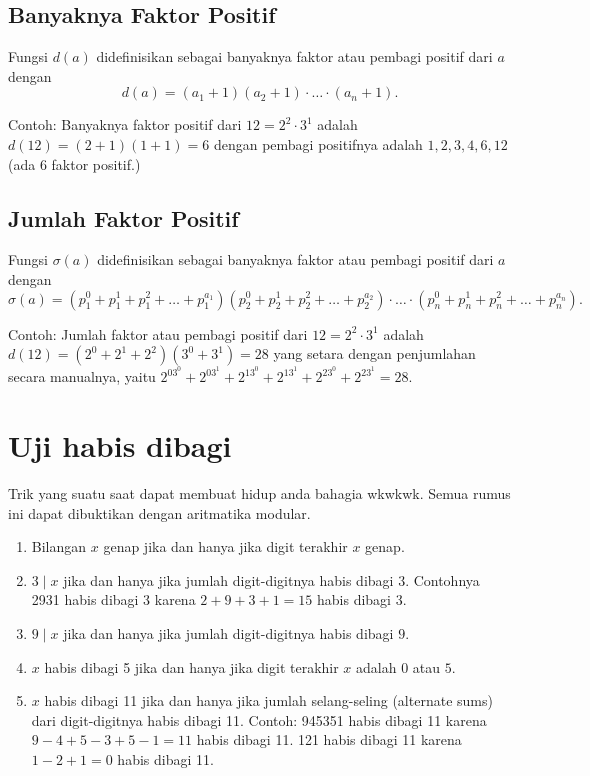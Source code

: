 \documentclass[11pt]{scrartcl}
\begin{document}
	     \subsection{Banyaknya Faktor Positif}
	     Fungsi $d(a)$ didefinisikan sebagai banyaknya faktor atau pembagi positif dari $a$ dengan
	     $$d(a) = (a_1+1)(a_2+1)\cdot \ldots \cdot (a_n+1).$$
	     
	     Contoh: Banyaknya faktor positif dari $12= 2^2 \cdot 3^1$ adalah $d(12)=(2+1)(1+1)=6$ dengan pembagi positifnya adalah $1,2,3,4,6,12$ (ada 6 faktor positif.)
	     
	     \subsection{Jumlah Faktor Positif}
	     Fungsi $\sigma (a)$ didefinisikan sebagai banyaknya faktor atau pembagi positif dari $a$ dengan
	     $$\sigma (a) = (p_1^0+p_1^1+p_1^2+\dots+p_1^{a_1})(p_2^0+p_2^1+p_2^2+\dots+p_2^{a_2})\cdot \ldots \cdot (p_n^0+p_n^1+p_n^2+\dots+p_n^{a_n}).$$
	     
	     Contoh: Jumlah faktor atau pembagi positif dari $12= 2^2 \cdot 3^1$ adalah $d(12)=(2^0+2^1+2^2)(3^0+3^1)=28$ yang setara dengan penjumlahan secara manualnya, yaitu $2^03^0+2^03^1+2^13^0+2^13^1+2^23^0+2^23^1=28.$
	     
	     \section{Uji habis dibagi}
	         Trik yang suatu saat dapat membuat hidup anda bahagia wkwkwk. Semua rumus ini dapat dibuktikan dengan aritmatika modular.
	         \begin{enumerate}
	             \item Bilangan $x$ genap jika dan hanya jika digit terakhir $x$ genap.
	             \item $3 \mid x$ jika dan hanya jika jumlah digit-digitnya habis dibagi $3$. Contohnya 2931 habis dibagi 3 karena $2+9+3+1=15$ habis dibagi 3.
	             \item $9 \mid x$ jika dan hanya jika jumlah digit-digitnya habis dibagi $9$.
	             \item $x$ habis dibagi 5 jika dan hanya jika digit terakhir $x$ adalah $0$ atau $5$.
	             \item $x$ habis dibagi 11 jika dan hanya jika jumlah selang-seling (alternate sums) dari digit-digitnya habis dibagi 11. Contoh: 945351 habis dibagi 11 karena $9-4+5-3+5-1=11$ habis dibagi 11. 121 habis dibagi 11 karena $1-2+1=0$ habis dibagi 11.
	         \end{enumerate}
	         
\end{document}
